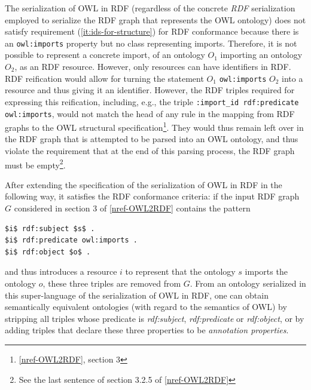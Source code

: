 \documentclass[10pt, a4paper]{isov2}
\renewcommand{\noterefname}{note}
\renewcommand{\nref}[1]{\noterefname~\ref{#1}}
\renewcommand{\nref}[1]{\ref{nref-#1}}
\begin{document}
The serialization of OWL in RDF (regardless of the concrete \emph{RDF} serialization employed to serialize the RDF graph that represents the OWL ontology) does not satisfy requirement (\ref{it:ids-for-structure}) for RDF conformance because there is an \texttt{owl:imports} property but no class representing imports. 
Therefore, it is not possible to represent a concrete import, of an ontology $O_1$ importing an ontology $O_2$, as an RDF resource.
However, only resources can have identifiers in RDF.
RDF reification would allow for turning the statement $O_1$ \texttt{owl:imports} $O_2$ into a resource and thus giving it an identifier. 
However, the RDF triples required for expressing this reification, including, e.g., the triple \texttt{:import\_id rdf:predicate owl:imports},  would not match the head of any rule in the mapping from RDF graphs to the OWL structural specification\footnote{\nref{OWL2RDF}, section 3}. 
They would thus remain left over in the RDF graph that is attempted to be parsed into an OWL ontology, and thus violate the requirement that at the end of this parsing process, the RDF graph must be empty\footnote{See the last sentence of section 3.2.5 of \nref{OWL2RDF}}.

After extending the specification of the serialization of OWL in RDF in the following way, it satisfies the RDF conformance criteria: if the input RDF graph $G$ considered in section 3 of \nref{OWL2RDF} contains the pattern

\begin{lstlisting}[basicstyle=\small\ttfamily,language=N3,mathescape]
$i$ rdf:subject $s$ .
$i$ rdf:predicate owl:imports .
$i$ rdf:object $o$ .
\end{lstlisting}

and thus introduces a resource $i$ to represent that the ontology $s$ imports the ontology $o$, these three triples are removed from $G$.
From an ontology serialized in this super-language of the serialization of OWL in RDF, one can obtain semantically equivalent ontologies (with regard to the semantics of OWL) by stripping all triples whose predicate is \textit{rdf:subject}, \textit{rdf:predicate} or \textit{rdf:object}, or by adding triples that declare these three properties to be \emph{annotation properties}.


\end{document}
